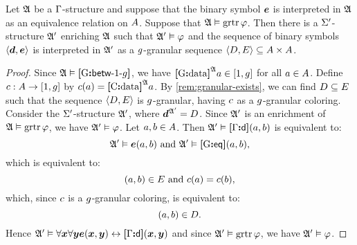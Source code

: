 \begin{lemma}\label{lem:granular-tr-to-f}
Let $\mathfrak{A}$ be a $\mathrm{\Gamma}$-structure and suppose that the binary symbol $\bm{e}$ is
interpreted in $\mathfrak{A}$ as an equivalence relation on $A$.
Suppose that $\mathfrak{A} \vDash \operatorname{grtr}\varphi$.
Then there is a $\mathrm{\Sigma'}$-structure $\mathfrak{A'}$ enriching $\mathfrak{A}$ such that 
$\mathfrak{A'} \vDash \varphi$ and the sequence of binary symbols $\left\langle \bm{d},\bm{e} \right\rangle$ is
interpreted in $\mathfrak{A'}$ as a $g$-granular sequence $\left\langle D,E \right\rangle
\subseteq {A\times A}$.
\end{lemma}
\begin{proof}
Since $\mathfrak{A} \vDash {\bm{[}\mathrm{G}\mathord{\bm{:}}\mathsf{betw}{\hbox{-}}1{\hbox{-}}g\bm{]}}$, we have 
${\bm{[}\mathrm{G}\mathord{\bm{:}}\mathrm{data}\bm{]}}^{\mathfrak{A}}a \in [1,g]$ for all $a \in A$.
Define ${c : A \to [1,g]}$ by $c(a) = {\bm{[}\mathrm{C}\mathord{\bm{:}}\mathrm{data}\bm{]}}^{\mathfrak{A}}a$.
By \cref{rem:granular-exists}, we can find $D \subseteq E$ such that 
the sequence $\left\langle D,E \right\rangle$ is $g$-granular, having $c$ as a
$g$-granular coloring.
Consider the $\mathrm{\Sigma'}$-structure $\mathfrak{A'}$, where $\bm{d}^{\mathfrak{A'}} = D$.
Since $\mathfrak{A'}$ is an enrichment of $\mathfrak{A} \vDash \operatorname{grtr}\varphi$, we have
$\mathfrak{A'} \vDash \varphi$.
Let $a,b \in A$. 
Then $\mathfrak{A'} \vDash {\bm{[}\mathrm{\Gamma}\mathord{\bm{:}}\mathsf{d}\bm{]}}(a,b)$ is equivalent to:
\[
  \mathfrak{A'} \vDash \bm{e}(a,b) \text{ and } \mathfrak{A'} \vDash {\bm{[}\mathrm{G}\mathord{\bm{:}}\mathsf{eq}\bm{]}}(a,b),
\]
which is equivalent to:
\[
  (a,b) \in E \text{ and } c(a) = c(b),
\]
which, since $c$ is a $g$-granular coloring, is equivalent to:
\[
  (a,b) \in D.
\]
Hence
$\mathfrak{A'} \vDash \forall\bm{x} \forall\bm{y} \bm{e}(\bm{x},\bm{y}) \leftrightarrow {\bm{[}\mathrm{\Gamma}\mathord{\bm{:}}\mathsf{d}\bm{]}}(\bm{x},\bm{y})$ 
and since $\mathfrak{A'} \vDash \operatorname{grtr}\varphi$, we have $\mathfrak{A'} \vDash \varphi$.
\end{proof}
